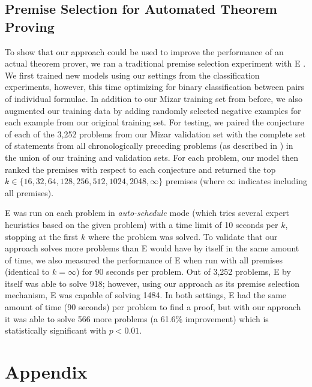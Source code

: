 \documentclass{article}
\begin{document}
\subsection{Premise Selection for Automated Theorem Proving}
\label{sec:E}
To show that our approach could be used to improve the performance of an actual theorem prover, we ran a traditional premise selection experiment with E \cite{schulz2013system}. We first trained new models using our settings from the classification experiments, however, this time optimizing for binary classification between pairs of individual formulae. In addition to our Mizar training set from before, we also augmented our training data by adding randomly selected negative examples for each example from our original training set. For testing, we paired the conjecture of each of the 3,252 problems from our Mizar validation set with the complete set of statements from all chronologically preceding problems (as described in \cite{irving2016deepmath}) in the union of our training and validation sets. For each problem, our model then ranked the premises with respect to each conjecture and returned the top $k \in \{ 16, 32, 64, 128, 256, 512, 1024, 2048, \infty \}$ premises (where $\infty$ indicates including all premises).

E was run on each problem in \textit{auto-schedule} mode (which tries several expert heuristics based on the given problem) with a time limit of 10 seconds per $k$, stopping at the first $k$ where the problem was solved. To validate that our approach solves more problems than E would have by itself in the same amount of time, we also measured the performance of E when run with all premises (identical to $k = \infty$) for 90 seconds per problem. Out of 3,252 problems, E by itself was able to solve 918; however, using our approach as its premise selection mechanism, E was capable of solving 1484. In both settings, E had the same amount of time (90 seconds) per problem to find a proof, but with our approach it was able to solve 566 more problems (a 61.6\% improvement) which is statistically significant with $p < 0.01$.



 


 






\section{Appendix}
\label{sec:appendix}
\end{document}
